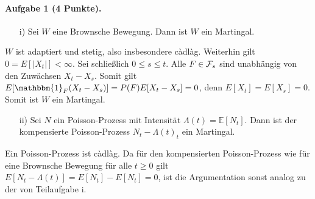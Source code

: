 \documentclass{article}
\begin{document}
\paragraph{Aufgabe 1 \textnormal{(4 Punkte)}.}
\begin{itemize}
\item [i)] Sei $W$ eine Brownsche Bewegung.
  Dann ist $W$ ein Martingal.
\end{itemize}
$W$ ist adaptiert und stetig, also insbesondere càdlàg.
Weiterhin gilt $0=E[|X_t|]<\infty$.
Sei schließlich $0\leq s\leq t$.
Alle $F\in{\cal F}_s$ sind unabhängig von den Zuwächsen $X_t-X_s$.
Somit gilt $E[\mathbbm{1}_F(X_t-X_s)]=P(F)E[X_t-X_s]=0$, denn $E[X_t]=E[X_s]=0$.
Somit ist $W$ ein Martingal.
\begin{itemize}
\item [ii)] Sei $N$ ein Poisson-Prozess mit Intensität $\Lambda(t)=\mathbb{E}[N_t]$.
  Dann ist der kompensierte Poisson-Prozess $N_t-\Lambda(t)_t$ ein Martingal.
\end{itemize}
Ein Poisson-Prozess ist càdlàg.
Da für den kompensierten Poisson-Prozess wie für eine Brownsche Bewegung für alle $t\geq0$ gilt $E[N_t-\Lambda(t)]=E[N_t]-E[N_t]=0$, ist die Argumentation sonst analog zu der von Teilaufgabe i.
\pagebreak
\end{document}
